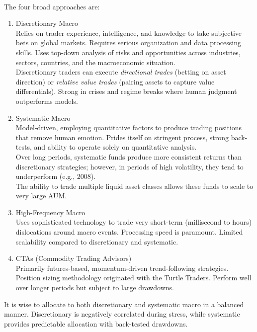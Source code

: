 \documentclass[a4paper,oneside,openany]{book}
\begin{document}
\begin{remark} \\
The four broad approaches are:
\begin{enumerate}[label=\roman*.]
\setlength{\itemsep}{0pt}
\item Discretionary Macro\\
Relies on trader experience, intelligence, and knowledge to take subjective bets on global markets. Requires serious organization and data processing skills. Uses top-down analysis of risks and opportunities across industries, sectors, countries, and the macroeconomic situation.\\
Discretionary traders can execute \textit{directional trades} (betting on asset direction) or \textit{relative value trades} (pairing assets to capture value differentials). Strong in crises and regime breaks where human judgment outperforms models.
\item Systematic Macro\\
Model-driven, employing quantitative factors to produce trading positions that remove human emotion. Prides itself on stringent process, strong back-tests, and ability to operate solely on quantitative analysis.\\
Over long periods, systematic funds produce more consistent returns than discretionary strategies; however, in periods of high volatility, they tend to underperform (e.g., 2008).\\
The ability to trade multiple liquid asset classes allows these funds to scale to very large AUM.
\item High-Frequency Macro\\
Uses sophisticated technology to trade very short-term (millisecond to hours) dislocations around macro events. Processing speed is paramount. Limited scalability compared to discretionary and systematic.
\item CTAs (Commodity Trading Advisors)\\
Primarily futures-based, momentum-driven trend-following strategies. Position sizing methodology originated with the Turtle Traders. Perform well over longer periods but subject to large drawdowns.
\end{enumerate}
It is wise to allocate to both discretionary and systematic macro in a balanced manner. Discretionary is negatively correlated during stress, while systematic provides predictable allocation with back-tested drawdowns.
\end{remark}
\end{document}
